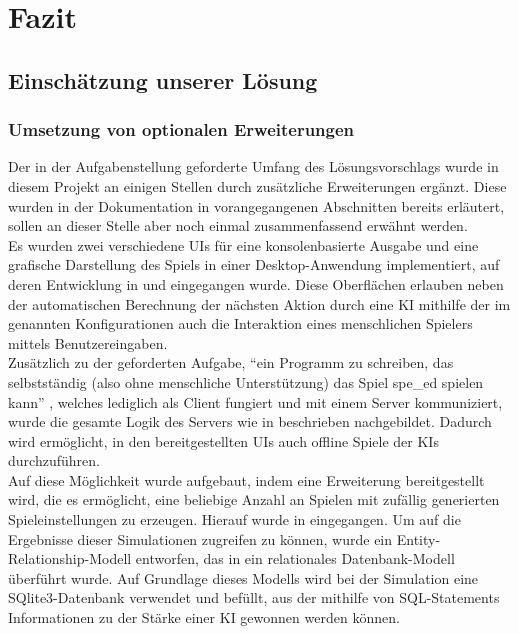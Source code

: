 \chapter{Fazit}
\label{ch:fazit}

\section{Einschätzung unserer Lösung}
\label{sec:einschaetzung}


\subsection{Umsetzung von optionalen Erweiterungen}
\label{subsec:optionale-erweiterungen}

Der in der Aufgabenstellung geforderte Umfang des Lösungsvorschlags  wurde in diesem Projekt
an einigen Stellen durch zusätzliche Erweiterungen ergänzt.
Diese wurden in der Dokumentation in vorangegangenen Abschnitten bereits erläutert, sollen an dieser Stelle aber noch
einmal zusammenfassend erwähnt werden. \\

Es wurden zwei verschiedene \ac{UI}s für eine konsolenbasierte Ausgabe und eine grafische Darstellung des Spiels in
einer Desktop-Anwendung implementiert, auf deren Entwicklung in  und
 eingegangen wurde.
Diese Oberflächen erlauben neben der automatischen Berechnung der nächsten Aktion durch eine \ac{KI} mithilfe der im
 genannten Konfigurationen auch die Interaktion eines menschlichen Spielers mittels
Benutzereingaben. \\

Zusätzlich zu der geforderten Aufgabe, "`ein Programm zu schreiben, das selbstständig (also ohne menschliche
Unterstützung) das Spiel spe\_ed spielen kann"' , welches lediglich als Client fungiert und
mit einem Server kommuniziert, wurde die gesamte Logik des Servers wie in 
beschrieben nachgebildet.
Dadurch wird ermöglicht, in den bereitgestellten \ac{UI}s auch offline Spiele der \ac{KI}s durchzuführen. \\

Auf diese Möglichkeit wurde aufgebaut, indem eine Erweiterung bereitgestellt wird, die es ermöglicht, eine beliebige
Anzahl an Spielen mit zufällig generierten Spieleinstellungen zu erzeugen.
Hierauf wurde in  eingegangen.
Um auf die Ergebnisse dieser Simulationen zugreifen zu können, wurde ein Entity-Relationship-Modell entworfen, das in
ein relationales Datenbank-Modell überführt wurde.
Auf Grundlage dieses Modells wird bei der Simulation eine SQlite3-Datenbank verwendet und befüllt, aus der mithilfe von
SQL-Statements Informationen zu der Stärke einer \ac{KI} gewonnen werden können. \\

